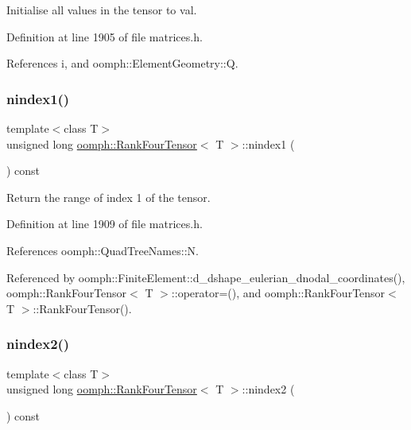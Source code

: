 Initialise all values in the tensor to val. 



Definition at line 1905 of file matrices.\+h.



References i, and oomph\+::\+Element\+Geometry\+::Q.

\mbox{\label{classoomph_1_1RankFourTensor_a96a373f0573d4fc37a23a6eaee4c3fec}} 
\subsubsection{\texorpdfstring{nindex1()}{nindex1()}}
{\footnotesize\ttfamily template$<$class T$>$ \\
unsigned long \hyperlink{classoomph_1_1RankFourTensor}{oomph\+::\+Rank\+Four\+Tensor}$<$ T $>$\+::nindex1 (\begin{DoxyParamCaption}{ }\end{DoxyParamCaption}) const\hspace{0.3cm}{\ttfamily [inline]}}



Return the range of index 1 of the tensor. 



Definition at line 1909 of file matrices.\+h.



References oomph\+::\+Quad\+Tree\+Names\+::N.



Referenced by oomph\+::\+Finite\+Element\+::d\+\_\+dshape\+\_\+eulerian\+\_\+dnodal\+\_\+coordinates(), oomph\+::\+Rank\+Four\+Tensor$<$ T $>$\+::operator=(), and oomph\+::\+Rank\+Four\+Tensor$<$ T $>$\+::\+Rank\+Four\+Tensor().

\mbox{\label{classoomph_1_1RankFourTensor_a78ffffb217f84535529c6c9cb5d1b91f}} 
\subsubsection{\texorpdfstring{nindex2()}{nindex2()}}
{\footnotesize\ttfamily template$<$class T$>$ \\
unsigned long \hyperlink{classoomph_1_1RankFourTensor}{oomph\+::\+Rank\+Four\+Tensor}$<$ T $>$\+::nindex2 (\begin{DoxyParamCaption}{ }\end{DoxyParamCaption}) const\hspace{0.3cm}{\ttfamily [inline]}}



